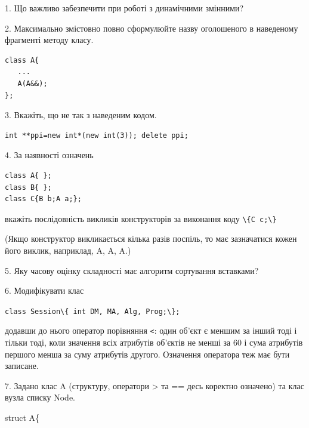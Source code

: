 \documentclass[12pt, ukrainian]{article}
\def\code#1{\Verb!#1!}
\begin{document}
{%
1. Що важливо забезпечити при роботі з динамічними змінними?%
\par
\vspace{2mm}
2. Максимально змістовно повно сформулюйте назву оголошеного в наведеному фрагменті методу класу.
\vspace{-3mm}
\begin{verbatim}class A{
   ...
   A(A&&);
};\end{verbatim}
\vspace{-3mm}
\par
\vspace{2mm}
3. Вкажіть, що не так з наведеним кодом.
\vspace{-3mm}
\begin{verbatim}int **ppi=new int*(new int(3)); delete ppi;\end{verbatim}
\vspace{-3mm}
\par
\vspace{2mm}
4. За наявності означень
\vspace{-3mm}
\begin{verbatim}
class A{ };
class B{ };
class C{B b;A a;};\end{verbatim}
\vspace{-3mm}
вкажіть послідовність викликів конструкторів за виконання коду \code{\{C c;\}} 

(Якщо конструктор викликається кілька разів поспіль, то має зазначатися кожен його виклик, наприклад, A, A, A.)

\vspace{2mm}
5. Яку часову оцінку складності має алгоритм сортування вставками?
\par
\vspace{2mm}
6. Модифікувати клас 

\qquad\code{class Session\{ int DM, MA, Alg, Prog;\};} 


додавши до нього оператор порівняння \code{<}: один об'єкт є меншим за інший тоді і тільки тоді, коли значення всіх атрибутів об'єктів не менші за 60 і сума атрибутів першого менша за суму атрибутів другого. Означення оператора теж має бути записане.%
\par
\vspace{2mm}
7. 
Задано клас A (структуру, оператори > та == десь коректно означено) та клас вузла списку Node.

struct A\{

}
\end{document}
